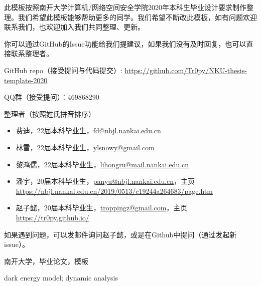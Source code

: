 

\begin{zhaiyao}
\begin{spacing}{1.5}
{


此模板按照南开大学计算机/网络空间安全学院2020年本科生毕业设计要求制作整理。我们希望此模板能够帮助更多的同学。我们希望不断改此模板，如有问题欢迎联系我们，也欢迎加入我们共同整理、更新。

你可以通过GitHub的Issue功能给我们提建议，如果我们没有及时回复，也可以直接联系整理者。

GitHub repo（接受提问与代码提交）: \url{https://github.com/Tr0py/NKU-thesis-template-2020}

QQ群（接受提问）：469868290

整理者（按照姓氏拼音排序）
\begin{itemize}
    \item 费迪，22届本科毕业生，\url{fd@nbjl.nankai.edu.cn}
    \item 林雪，22届本科毕业生，\url{ylsnowy@gmail.com}
    \item 黎鸿儒，22届本科毕业生，\url{lihongru@mail.nankai.edu.cn}
    \item 潘宇，20届本科毕业生，\url{panyu@nbjl.nankai.edu.cn}，主页\url{https://nbjl.nankai.edu.cn/2019/0513/c19244a264683/page.htm}
    \item 赵子懿，20届本科毕业生，\url{troppingz@gmail.com}，主页\url{https://tr0py.github.io/}
\end{itemize}
}

如果遇到问题，可以发邮件询问赵子懿，或是在Github中提问（通过发起新issue）。

\end{spacing}
\end{zhaiyao}




\begin{guanjianci}
南开大学，毕业论文，模板
\end{guanjianci}



\begin{abstract}
\begin{spacing}{1.5}
Since 1998, two independent supernova research groups have discovered that the universe is accelerating, and the dark energy has become a hot topic in cosmology. 

\end{spacing}
\end{abstract}


\begin{keywords}
dark energy model; dynamic analysis
\end{keywords} 
